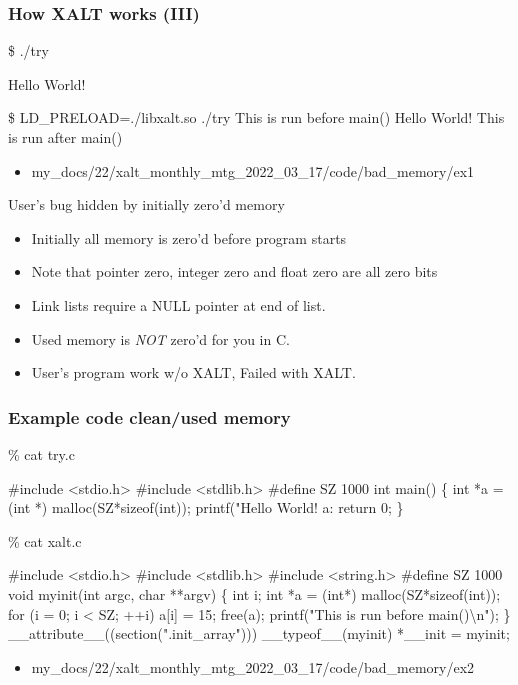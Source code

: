 \documentclass{beamer}
\begin{document}
\begin{frame}[fragile]
    \frametitle{How XALT works (III)}
 {\small
    \begin{semiverbatim}
\$ ./try

Hello World!

\$ LD\_PRELOAD=./libxalt.so  ./try
This is run before main()
Hello World!
This is run after main()
    \end{semiverbatim}
}
  \begin{itemize}
    \item my\_docs/22/xalt\_monthly\_mtg\_2022\_03\_17/code/bad\_memory/ex1
  \end{itemize}

\end{frame}

\begin{frame}{User's bug hidden by initially zero'd memory}
  \begin{itemize}
    \item Initially all memory is zero'd before program starts
    \item Note that pointer zero, integer zero and float zero are all
      zero bits
    \item Link lists require a NULL pointer at end of list.
    \item Used memory is {\color{red} \emph{NOT}} zero'd for you in C.
    \item User's program work w/o XALT, Failed with XALT.
  \end{itemize}
\end{frame}

\begin{frame}[fragile]
    \frametitle{Example code clean/used memory}
 {\tiny
    \begin{semiverbatim}
\% cat try.c

#include <stdio.h>
#include <stdlib.h>
#define SZ 1000
int main()
\{
  int *a = (int *) malloc(SZ*sizeof(int));
  printf("Hello World! a:%
  return 0;
\}

\% cat xalt.c

#include <stdio.h>
#include <stdlib.h>
#include <string.h>
#define SZ 1000
void myinit(int argc, char **argv)
\{
  int i;
  int *a = (int*) malloc(SZ*sizeof(int));
  for (i = 0; i < SZ; ++i) a[i] = 15; 
  free(a);
  printf("This is run before main()\textbackslash{}n");
\}
__attribute__((section(".init_array"))) __typeof__(myinit) *__init = myinit;
    \end{semiverbatim}
}

  \begin{itemize}
    \item my\_docs/22/xalt\_monthly\_mtg\_2022\_03\_17/code/bad\_memory/ex2
  \end{itemize}
\end{frame}
\end{document}
